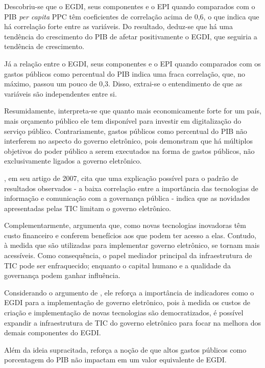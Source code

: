 Descobriu-se que o EGDI, seus componentes e o EPI quando comparados com o PIB \textit{per capita} PPC têm coeficientes de correlação acima de 0,6, o que indica que há correlação forte entre as variáveis. Do resultado, deduz-se que há uma tendência do crescimento do PIB de afetar positivamente o EGDI, que seguiria a tendência de crescimento.

Já a relação entre o EGDI, seus componentes e o EPI quando comparados com os gastos públicos como percentual do PIB indica uma fraca correlação, que, no máximo, passou um pouco de 0,3. Disso, extrai-se o entendimento de que as variáveis são independentes entre si.

Resumidamente, interpreta-se que quanto mais economicamente forte for um país, mais orçamento público ele tem disponível para investir em digitalização do serviço público. Contrariamente, gastos públicos como percentual do PIB não interferem no aspecto do governo eletrônico, pois demonstram que há múltiplos objetivos do poder público a serem executados na forma de gastos públicos, não exclusivamente ligados a governo eletrônico.

\cite{singh2007country}, em seu artigo de 2007, cita que uma explicação possível para o padrão de resultados observados - a baixa correlação entre a importância das tecnologias de informação e comunicação com a governança pública - indica que as novidades apresentadas pelas TIC limitam o governo eletrônico.

Complementarmente, \cite{singh2007country} argumenta que, como novas tecnologias inovadoras têm custo financeiro e conferem benefícios aos que podem ter acesso a elas. Contudo, à medida que são utilizadas para implementar governo eletrônico, se tornam mais acessíveis. Como consequência, o papel mediador principal da infraestrutura de TIC pode ser enfraquecido; enquanto o capital humano e a qualidade da governança podem ganhar influência.

 Considerando o argumento de \cite{singh2007country}, ele reforça a importância de indicadores como o EGDI para a implementação de governo eletrônico, pois à medida os custos de criação e implementação de novas tecnologias são democratizados, é possível expandir a infraestrutura de TIC do governo eletrônico para focar na melhora dos demais componentes do EGDI.

Além da ideia supracitada, \cite{singh2007country} reforça a noção de que altos gastos públicos como porcentagem do PIB não impactam em um valor equivalente de EGDI.


